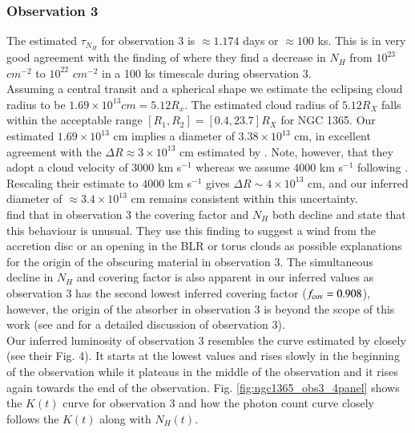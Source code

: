 \documentclass{aa}
\begin{document}
\subsubsection*{Observation 3}
The estimated $\tau_{N_H}$ for observation 3 is $\approx 1.174$ days or $\approx 100$ ks. This is in very good agreement with the finding of \citet{Braito2014} where they find a decrease in $N_H$ from $10^{23}$ $cm^{-2}$ to $10^{22}$ $cm^{-2}$ in a 100 ks timescale during observation 3. \\
Assuming a central transit and a spherical shape we estimate the eclipsing cloud radius to be $1.69 \times 10^{13} cm  = 5.12 R_x$. The estimated cloud radius of $5.12 R_X$ falls within the acceptable range $[R_1, R_2] = [0.4, 23.7] R_X$ for NGC 1365. Our estimated $1.69 \times 10^{13}$ cm implies a diameter of $3.38 \times 10^{13}$ cm, in excellent agreement with the $\Delta R \approx 3 \times 10^{13}$ cm estimated by \citet{Braito2014}. Note, however, that they adopt a cloud velocity of $3000$ km s$^{-1}$ whereas we assume $4000$ km s$^{-1}$ following \citet{Torricelli2014}. Rescaling their estimate to $4000$ km s$^{-1}$ gives $\Delta R \sim 4 \times 10^{13}$ cm, and our inferred diameter of $\approx 3.4 \times 10^{13}$ cm remains consistent within this uncertainty. \\
\citet{Rivers2015} find that in observation 3 the covering factor and $N_H$ both decline and state that this behaviour is unusual. They use this finding to suggest a wind from the accretion disc or an opening in the BLR or torus clouds as possible explanations for the origin of the obscuring material in observation 3. The simultaneous decline in $N_H$ and covering factor is also apparent in our inferred values as observation 3 has the second lowest inferred covering factor ($f_{\rm cov} = 0.908$), however, the origin of the absorber in observation 3 is beyond the scope of this work (see \citealt{Braito2014} and \citealt{Rivers2015} for a detailed discussion of observation 3). \\
Our inferred luminosity of observation 3 resembles the curve estimated by \citet{Rivers2015} closely (see their Fig. 4). It starts at the lowest values and rises slowly in the beginning of the observation while it plateaus in the middle of the observation and it rises again towards the end of the observation. Fig. \ref{fig:ngc1365_obs3_4panel} shows the $K(t)$ curve for observation 3 and how the photon count curve closely follows the $K(t)$ along with $N_H(t)$. \\
\end{document}
